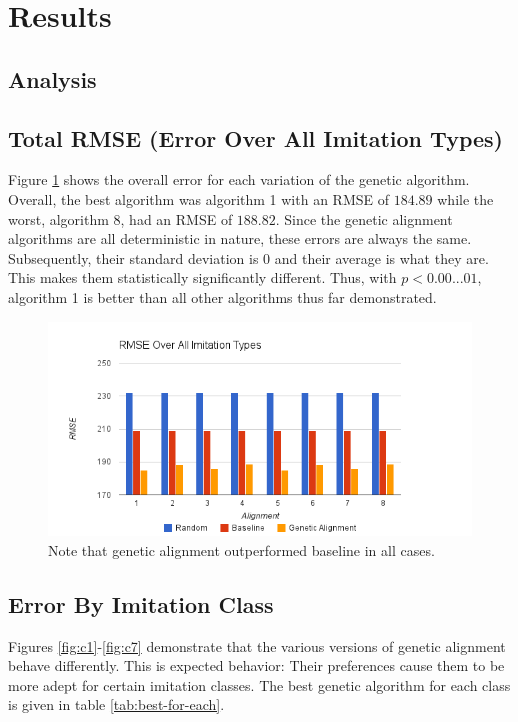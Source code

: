 \section {Results}
\label{results}

\subsection {Analysis} 

\subsection{Total RMSE (Error Over All Imitation Types)}
Figure \ref{fig:overall} shows the overall error for each variation of the genetic algorithm. Overall, the best algorithm was algorithm 1 with an RMSE of $184.89$ while the worst, algorithm 8, had an RMSE of $188.82$. Since the genetic alignment algorithms are all deterministic in nature, these errors are always the same. Subsequently, their standard deviation is 0 and their average is what they are. This makes them statistically significantly different. Thus, with $p < 0.00...01$, algorithm 1 is better than all other algorithms thus far demonstrated.

\begin{figure}[center]
	\centering
	\includegraphics[width=16cm]{images/chart9.png}
	\caption{Note that genetic alignment outperformed baseline in all cases.}
	\label{fig:overall}
\end{figure}

\subsection{Error By Imitation Class}
Figures \ref{fig:c1}-\ref{fig:c7} demonstrate that the various versions of genetic alignment behave differently. This is expected behavior: Their preferences cause them to be more adept for certain imitation classes. The best genetic algorithm for each class is given in table \ref{tab:best-for-each}.

